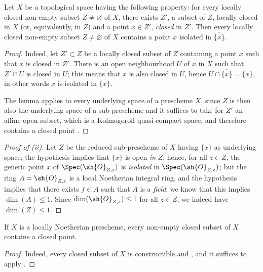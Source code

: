 \begin{lemma}[5.1.10.1]
\label{IV.5.1.10.1}
Let $X$ be a topological space having the following property: for every locally closed non-empty subset $Z\neq\varnothing$ of $X$, there exists $Z'$, a subset of $Z$, locally closed in $X$ (or, equivalently, in $Z$) and a point $x\in Z'$, \emph{closed} in $Z'$.
Then every locally closed non-empty subset $Z\neq\varnothing$ of $X$ contains a point $x$ isolated in $\overline{\{x\}}$.
\end{lemma}

\begin{proof}
Indeed, let $Z'\subset Z$ be a locally closed subset of $Z$ containing a point $x$ such that $x$ is closed in $Z'$.
There is an open neighbourhood $U$ of $x$ in $X$ such that $Z'\cap U$ is closed in $U$; this means that $x$ is also closed in $U$, hence $U\cap\overline{\{x\}}=\{x\}$, in other words $x$ is isolated in $\overline{\{x\}}$.

The lemma applies to every underlying space of a prescheme $X$, since $Z$ is then also the underlying space of a sub-prescheme  and it suffices to take for $Z'$ an affine open subset, which is a Kolmogoroff quasi-compact space, and therefore contains a closed point .
\end{proof}

\begin{proof}[Proof of \emph{(ii)}]
Let $Z$ be the reduced sub-prescheme of $X$ having $\overline{\{x\}}$ as underlying space; the hypothesis implies that $\{x\}$ is open \emph{in} $Z$; hence, for all $z\in Z$, the generic point $x$ of $\Spec(\sh{O}_{Z,z})$ is \emph{isolated} in $\Spec(\sh{O}_{Z,z})$; but the ring $A=\sh{O}_{Z,z}$ is a local Noetherian integral ring, and the hypothesis implies that there exists $f\in A$ such that $A$ is a \emph{field}; we know  that this implies $\dim(A)\leq 1$.
Since $\dim(\sh{O}_{Z,z})\leq 1$ for all $z\in Z$, we indeed have $\dim(Z)\leq 1$.
\end{proof}

\begin{corollary}[5.1.11]
\label{IV.5.1.11}
If $X$ is a locally Noetherian prescheme, every non-empty closed subset of $X$ contains a closed point.
\end{corollary}

\begin{proof}
Indeed, every closed subset of $X$ is constructible  and , and it suffices to apply .
\end{proof}

